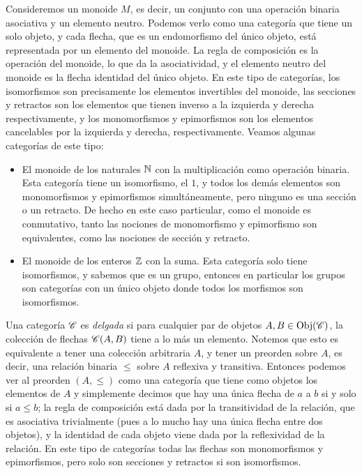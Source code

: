 \documentclass{comunicaciones}
\begin{document}
\begin{ej}[Monoides]\label{Monoides}
    Consideremos un monoide $M$, es decir, un conjunto con una operación binaria asociativa y un elemento neutro. 
    Podemos verlo como una categoría que tiene un solo objeto, y cada flecha, que es un endomorfismo del único objeto, está representada por un elemento
    del monoide. La regla de composición es la operación del monoide, lo que da la asociatividad, y el elemento neutro del monoide es la flecha identidad
    del único objeto. En este tipo de categorías, los isomorfismos son precisamente los elementos invertibles del monoide, las secciones y retractos son los
    elementos que tienen inverso a la izquierda y derecha respectivamente, y los monomorfismos y epimorfismos son los elementos cancelables por la izquierda
    y derecha, respectivamente. Veamos algunas categorías de este tipo:
    \begin{itemize}
        \item El monoide de los naturales $\mathbb N$ con la multiplicación como operación binaria. Esta categoría tiene un isomorfismo, el $1$, y todos
        los demás elementos son monomorfismos y epimorfismos simultáneamente, pero ninguno es una sección o un retracto. De hecho en este caso particular, como
        el monoide es conmutativo, tanto las nociones de monomorfismo y epimorfismo son equivalentes, como las nociones de sección y retracto.
        \item El monoide de los enteros $\mathbb Z$ con la suma. Esta categoría solo tiene isomorfismos, y sabemos que es un grupo, entonces en particular 
        los grupos son categorías con un único objeto donde todos los morfismos son isomorfismos.
    \end{itemize}
\end{ej}

\begin{ej}\label{categoria delgada}
    Una categoría $\mathscr C$ es \emph{delgada} si para cualquier par de objetos $A,B\in\mathrm{Obj}(\mathscr C)$, la colección de flechas $\mathscr C(A,B)$ tiene a lo más un elemento.
    Notemos que esto es equivalente a tener una colección arbitraria $A$, y tener un preorden sobre $A$, es decir, una relación binaria $\leq$ sobre $A$ 
    reflexiva y transitiva. Entonces podemos ver al preorden $(A,\leq)$ como una categoría que tiene como objetos los elementos de $A$ y simplemente decimos que hay
    una única flecha de $a$ a $b$ si y solo si $a\leq b$; la regla de composición está dada por la transitividad de la relación, que es asociativa trivialmente 
    (pues a lo mucho hay una única flecha entre dos objetos), y la identidad de cada objeto viene dada por la reflexividad de la relación. En este tipo de categorías
    todas las flechas son monomorfismos y epimorfismos, pero solo son secciones y retractos si son isomorfismos.
\end{ej}
\end{document}
